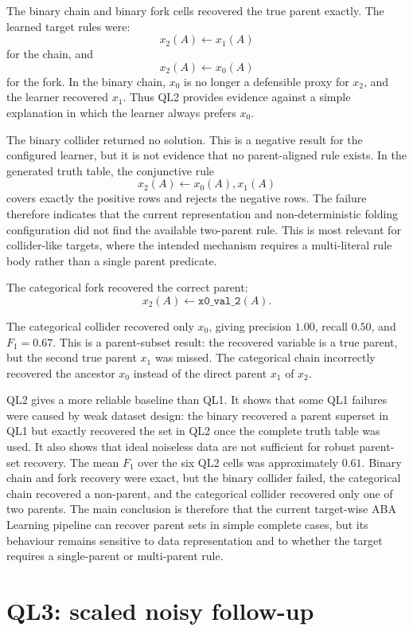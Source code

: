 The binary chain and binary fork cells recovered the true parent exactly. The learned target rules were:
\[
x_2(A) \leftarrow x_1(A)
\]
for the chain, and
\[
x_2(A) \leftarrow x_0(A)
\]
for the fork. In the binary chain, \(x_0\) is no longer a defensible proxy for \(x_2\), and the learner recovered \(x_1\). Thus QL2 provides evidence against a simple explanation in which the learner always prefers \(x_0\).

The binary collider returned no solution. This is a negative result for the configured learner, but it is not evidence that no parent-aligned rule exists. In the generated truth table, the conjunctive rule
\[
x_2(A) \leftarrow x_0(A),x_1(A)
\]
covers exactly the positive rows and rejects the negative rows. The failure therefore indicates that the current representation and non-deterministic folding configuration did not find the available two-parent rule. This is most relevant for collider-like targets, where the intended mechanism requires a multi-literal rule body rather than a single parent predicate.

The categorical fork recovered the correct parent:
\[
x_2(A) \leftarrow \texttt{x0\_val\_2}(A).
\]

The categorical collider recovered only \(x_0\), giving precision \(1.00\), recall \(0.50\), and \(F_1=0.67\). This is a parent-subset result: the recovered variable is a true parent, but the second true parent \(x_1\) was missed. The categorical chain incorrectly recovered the ancestor \(x_0\) instead of the direct parent  \(x_1\) of \(x_2\).

QL2 gives a more reliable baseline than QL1. It shows that some QL1 failures were caused by weak dataset design: the binary recovered a parent superset in QL1 but exactly recovered the set in QL2 once the complete truth table was used. It also shows that ideal noiseless data are not sufficient for robust parent-set recovery. The mean \(F_1\) over the six QL2 cells was approximately \(0.61\). Binary chain and fork recovery were exact, but the binary collider failed, the categorical chain recovered a non-parent, and the categorical collider recovered only one of two parents. The main conclusion is therefore that the current target-wise ABA Learning pipeline can recover parent sets in simple complete cases, but its behaviour remains sensitive to data representation and to whether the target requires a single-parent or multi-parent rule.

\section{QL3: scaled noisy follow-up}


